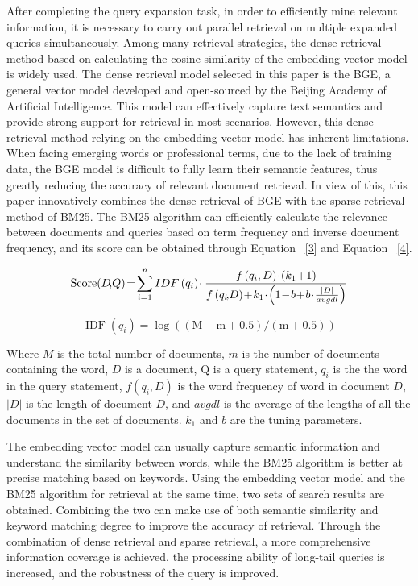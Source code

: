 After completing the query expansion task, in order to efficiently mine relevant information, it is necessary to carry out parallel retrieval on multiple expanded queries simultaneously. Among many retrieval strategies, the dense retrieval method based on calculating the cosine similarity of the embedding vector model is widely used. The dense retrieval model selected in this paper is the BGE, a general vector model developed and open-sourced by the Beijing Academy of Artificial Intelligence. This model can effectively capture text semantics and provide strong support for retrieval in most scenarios. However, this dense retrieval method relying on the embedding vector model has inherent limitations. When facing emerging words or professional terms, due to the lack of training data, the BGE model is difficult to fully learn their semantic features, thus greatly reducing the accuracy of relevant document retrieval.
In view of this, this paper innovatively combines the dense retrieval of BGE with the sparse retrieval method of BM25. The BM25 algorithm can efficiently calculate the relevance between documents and queries based on term frequency and inverse document frequency, and its score can be obtained through Equation ~\ref{3} and Equation ~\ref{4}. 


\begin{equation} \label{3}
\small
\operatorname{Score}(D\!,\! Q) \! = \! \sum_{i=1}^n IDF\left(q_i\right) \! \cdot 
\frac{f\left(q_i, D\right) \! \cdot \! \left(k_1 \!+ \!1\right)}{f\left(q_i \!, \! D\right) \! + \! k_1  \! \cdot \! \left(1 \! - \! b \! + \! b \! \cdot \! \frac{|D|}{a v g d l}\right)}
\end{equation}

\begin{equation} \label{4}
\operatorname{IDF}\left(q_i\right)=\log ((\mathrm{M}-\mathrm{m}+0.5) /(\mathrm{m}+0.5))
\end{equation}

Where $M$ is the total number of documents, $m$ is the number of documents containing the word, $D$ is a document, $\mathrm{Q}$ is a query statement, $q_i$ is the the word in the query statement, $f\left(q_i, D\right)$ is the word frequency of word  in document $D$, $|D|$ is the length of document $D$, and $avgdl$ is the average of the lengths of all the documents in the set of documents. $k_1$ and $b$ are the tuning parameters.

The embedding vector model can usually capture semantic information and understand the similarity between words, while the BM25 algorithm is better at precise matching based on keywords. Using the embedding vector model and the BM25 algorithm for retrieval at the same time, two sets of search results are obtained. Combining the two can make use of both semantic similarity and keyword matching degree to improve the accuracy of retrieval. Through the combination of dense retrieval and sparse retrieval, a more comprehensive information coverage is achieved, the processing ability of long-tail queries is increased, and the robustness of the query is improved.



